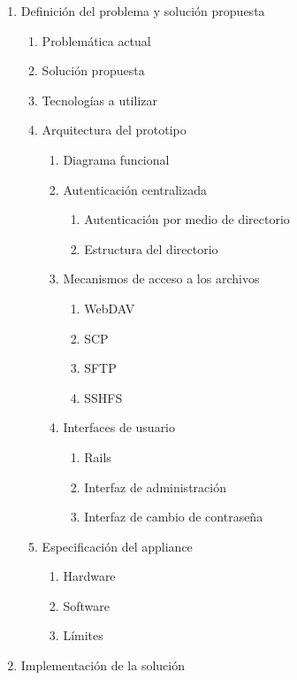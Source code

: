 {\begin{enumerate}
  \item Definici\'{o}n del problema y soluci\'{o}n propuesta
  \begin{enumerate}
    \item Problem\'{a}tica actual
    \item Soluci\'{o}n propuesta
    \item Tecnolog\'{i}as a utilizar
    \item Arquitectura del prototipo
    \begin{enumerate}
      \item Diagrama funcional
      \item Autenticaci\'{o}n centralizada
      \begin{enumerate}
        \item Autenticaci\'{o}n por medio de directorio
        \item Estructura del directorio
      \end{enumerate}
      \item Mecanismos de acceso a los archivos
      \begin{enumerate}
        \item WebDAV
        \item SCP
        \item SFTP
        \item SSHFS
      \end{enumerate}
      \item Interfaces de usuario
      \begin{enumerate}
        \item Rails
        \item Interfaz de administraci\'{o}n
        \item Interfaz de cambio de contrase\~{n}a
      \end{enumerate}
    \end{enumerate}
    \item Especificaci\'{o}n del appliance
    \begin{enumerate}
      \item Hardware
      \item Software
      \item L\'{i}mites
    \end{enumerate}
  \end{enumerate}
  \item Implementaci\'{o}n de la soluci\'{o}n

\end{enumerate}}
